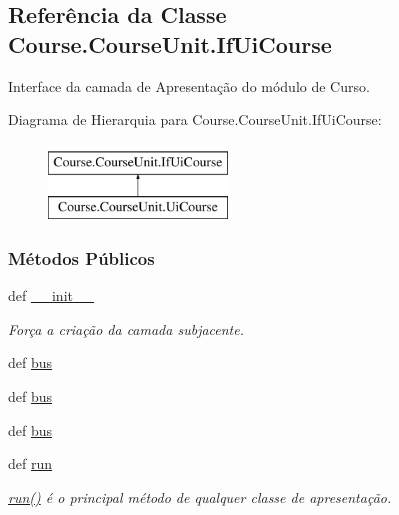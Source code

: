 \hypertarget{classCourse_1_1CourseUnit_1_1IfUiCourse}{\subsection{Referência da Classe Course.\-Course\-Unit.\-If\-Ui\-Course}
\label{classCourse_1_1CourseUnit_1_1IfUiCourse}
}


Interface da camada de Apresentação do módulo de Curso.  


Diagrama de Hierarquia para Course.\-Course\-Unit.\-If\-Ui\-Course\-:\begin{figure}[H]
\begin{center}
\leavevmode
\includegraphics[height=2.000000cm]{d6/d82/classCourse_1_1CourseUnit_1_1IfUiCourse}
\end{center}
\end{figure}
\subsubsection*{Métodos Públicos}
\begin{DoxyCompactItemize}
\item 
def \hyperlink{classCourse_1_1CourseUnit_1_1IfUiCourse_a2520bf9924cf4f583820ad9fac468fe2}{\-\_\-\-\_\-init\-\_\-\-\_\-}
\begin{DoxyCompactList}\small\item\em Força a criação da camada subjacente. \end{DoxyCompactList}\item 
def \hyperlink{classCourse_1_1CourseUnit_1_1IfUiCourse_a6d3c42a9777fe9dd395d9390aef47903}{bus}
\item 
def \hyperlink{classCourse_1_1CourseUnit_1_1IfUiCourse_a6d3c42a9777fe9dd395d9390aef47903}{bus}
\item 
def \hyperlink{classCourse_1_1CourseUnit_1_1IfUiCourse_a6d3c42a9777fe9dd395d9390aef47903}{bus}
\item 
def \hyperlink{classCourse_1_1CourseUnit_1_1IfUiCourse_a5b174a0ca1e8fec0bb322d518c6b9cbe}{run}
\begin{DoxyCompactList}\small\item\em \hyperlink{classCourse_1_1CourseUnit_1_1IfUiCourse_a5b174a0ca1e8fec0bb322d518c6b9cbe}{run()} é o principal método de qualquer classe de apresentação. \end{DoxyCompactList}\end{DoxyCompactItemize}
